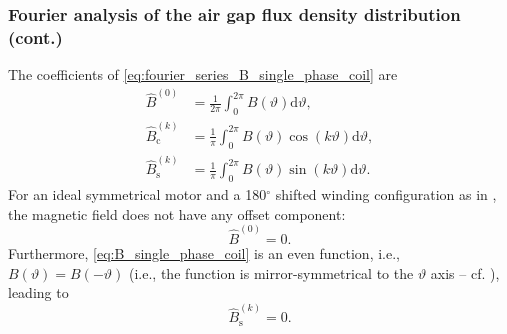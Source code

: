 \begin{frame}
	\frametitle{Fourier analysis of the air gap flux density distribution (cont.)}
        The coefficients of \eqref{eq:fourier_series_B_single_phase_coil} are
        \begin{equation}
            \begin{split}
                \hat{B}^{(0)} &= \frac{1}{2\pi} \int_{0}^{2\pi} B(\vartheta) \mathrm{d}\vartheta, \\
                \hat{B}_{\mathrm{c}}^{(k)} &= \frac{1}{\pi} \int_{0}^{2 \pi} B(\vartheta) \cos(k \vartheta) \mathrm{d}\vartheta, \\
                \hat{B}_{\mathrm{s}}^{(k)} &= \frac{1}{\pi} \int_{0}^{2\pi} B(\vartheta) \sin(k \vartheta) \mathrm{d}\vartheta.
            \end{split}
        \end{equation}
        For an ideal symmetrical motor and a 180$^\circ$ shifted winding configuration as in , the magnetic field does not have any offset component:
        $$\hat{B}^{(0)} = 0.$$ Furthermore, \eqref{eq:B_single_phase_coil} is an even function, i.e., $B(\vartheta)=B(-\vartheta)$ (i.e., the function is mirror-symmetrical to the $\vartheta$ axis -- cf. ), leading to $$\hat{B}_{\mathrm{s}}^{(k)} = 0.$$
\end{frame}

